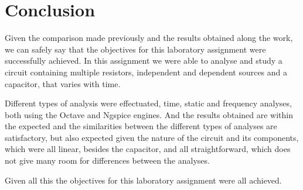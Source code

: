 \newpage
\section{Conclusion}
\label{sec:conclusion}
Given the comparison made previously and the results obtained along the work, we can safely say that the objectives for this laboratory assignment were successfully achieved. In this assignment we were able to analyse and study a circuit containing multiple resistors, independent and dependent sources and a capacitor, that varies with time.\par
Different types of analysis were effectuated, time, static and frequency analyses, both using the Octave and Ngspice engines. And the results obtained are within the expected and the similarities between the different types of analyses are satisfactory, but also expected given the nature of the circuit and its components, which were all linear, besides the capacitor, and all straightforward, which does not give many room for differences between the analyses.\par
Given all this the objectives for this laboratory assignment were all achieved.

